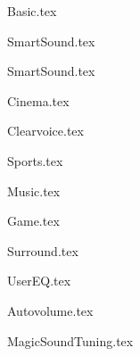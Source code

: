 {Basic.tex}

{SmartSound.tex}

{SmartSound.tex}

{Cinema.tex}

{Clearvoice.tex}

{Sports.tex}

{Music.tex}

{Game.tex}

{Surround.tex}


{UserEQ.tex}

{Autovolume.tex}




{MagicSoundTuning.tex}